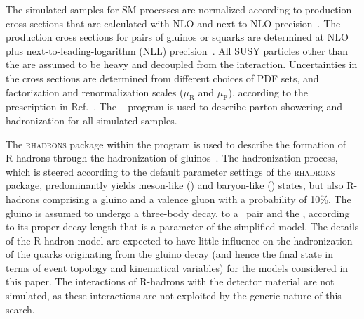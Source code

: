 The simulated samples for SM processes are normalized according to
production cross sections that are calculated with NLO and next-to-NLO
precision~\cite{Alwall2014, wphys, fewz, wwxs, top++, nlotop,
  powheg_top_Wt}. The production cross sections for pairs of gluinos
or squarks are determined at NLO plus next-to-leading-logarithm (NLL)
precision~\cite{Beenakker:1996ch, Kulesza:2008jb, Kulesza:2009kq,
  Beenakker:2009ha, Beenakker:2011fu, Borschensky:2014cia}. All SUSY
particles other than the \PSGczDo are assumed to be heavy and
decoupled from the interaction. Uncertainties in the cross sections
are determined from different choices of PDF sets, and factorization
and renormalization scales ($\mu_\text{R}$ and $\mu_\text{F}$),
according to the prescription in Ref.~\cite{Borschensky:2014cia}. The
~\cite{pythia} program is used to describe parton
showering and hadronization for all simulated samples.

The \textsc{rhadrons} package within the \PYTHIA program is used to
describe the formation of R-hadrons through the hadronization of
gluinos~\cite{Fairbairn:2006gg, Kraan:2004tz, Mackeprang:2006gx}. The
hadronization process, which is steered according to the default
parameter settings of the \textsc{rhadrons} package, predominantly
yields meson-like (\PSg\Pq\Paq) and baryon-like (\PSg\Pq\Pq\Pq)
states, but also R-hadrons comprising a gluino and a valence gluon
with a probability of 10\%.
The gluino is assumed to undergo a three-body decay, to a \Pq\Paq\
pair and the \PSGczDo, according to its proper decay length \ctau [mm]
that is a parameter of the simplified model. The details of the
R-hadron model are expected to have little influence on the
hadronization of the quarks originating from the gluino decay (and
hence the final state in terms of event topology and kinematical
variables) for the models considered in this paper. The interactions
of R-hadrons with the detector material are not simulated, as these
interactions are not exploited by the generic nature of this search.

